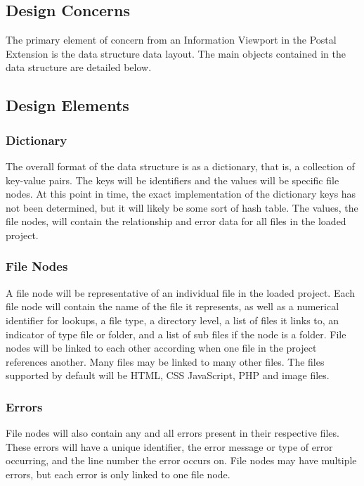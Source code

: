 \documentclass[letterpaper,10pt,titlepage,draftclsnofoot,onecolumn,onesided] {IEEEtran}
\begin{document}
\subsection{Design Concerns}
The primary element of concern from an Information Viewport in the Postal Extension is the data structure data layout. 
The main objects contained in the data structure are detailed below.

\subsection{Design Elements}

\subsubsection{Dictionary}
The overall format of the data structure is as a dictionary, that is, a collection of key-value pairs. 
The keys will be identifiers and the values will be specific file nodes. 
At this point in time, the exact implementation of the dictionary keys has not been determined, but it will likely be some sort of hash table.
The values, the file nodes, will contain the relationship and error data for all files in the loaded project.

\subsubsection{File Nodes}
A file node will be representative of an individual file in the loaded project. 
Each file node will contain the name of the file it represents, as well as a numerical identifier for lookups, a file type, a directory level, a list of files it links to, an indicator of type file or folder, and a list of sub files if the node is a folder.
File nodes will be linked to each other according when one file in the project references another. 
Many files may be linked to many other files.
The files supported by default will be HTML, CSS JavaScript, PHP and image files.
		
\subsubsection{Errors}
File nodes will also contain any and all errors present in their respective files.
These errors will have a unique identifier, the error message or type of error occurring, and the line number the error occurs on.
File nodes may have multiple errors, but each error is only linked to one file node.
\end{document}
